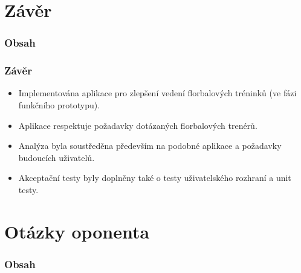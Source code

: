 \documentclass{beamer}
\begin{document}
\section{Závěr}

\begin{frame}
  \frametitle{Obsah}
  \tableofcontents[currentsection]
\end{frame}

\begin{frame}
  \frametitle{Závěr}

  \begin{itemize}
    \item Implementována aplikace pro zlepšení vedení florbalových tréninků (ve fázi funkčního prototypu).
    \item Aplikace respektuje požadavky dotázaných florbalových trenérů.
    \item Analýza byla soustředěna především na podobné aplikace a požadavky budoucích uživatelů.
    \item Akceptační testy byly doplněny také o testy uživatelského rozhraní a unit testy.
  \end{itemize}
\end{frame}

\section{Otázky oponenta}

\begin{frame}
  \frametitle{Obsah}
  \tableofcontents[currentsection]
\end{frame}
\end{document}
